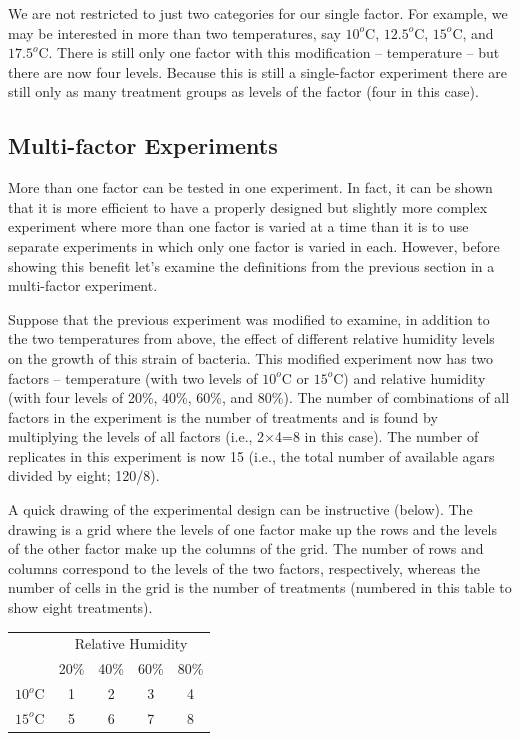 \documentclass[10pt,openany]{book}\usepackage[]{graphicx}\usepackage[]{color}
\begin{document}
We are not restricted to just two categories for our single factor.  For example, we may be interested in more than two temperatures, say $10^{o}$C, $12.5^{o}$C, $15^{o}$C, and $17.5^{o}$C.  There is still only one factor with this modification -- temperature -- but there are now four levels.  Because this is still a single-factor experiment there are still only as many treatment groups as levels of the factor (four in this case).

\subsection{Multi-factor Experiments}
More than one factor can be tested in one experiment.  In fact, it can be shown that it is more efficient to have a properly designed but slightly more complex experiment where more than one factor is varied at a time than it is to use separate experiments in which only one factor is varied in each.  However, before showing this benefit let's examine the definitions from the previous section in a multi-factor experiment.

Suppose that the previous experiment was modified to examine, in addition to the two temperatures from above, the effect of different relative humidity levels on the growth of this strain of bacteria.  This modified experiment now has two factors -- temperature (with two levels of $10^{o}$C or $15^{o}$C) and relative humidity (with four levels of 20\%, 40\%, 60\%, and 80\%).  The number of combinations of all factors in the experiment is the number of treatments and is found by multiplying the levels of all factors (i.e., 2$\times$4=8 in this case).  The number of replicates in this experiment is now 15 (i.e., the total number of available agars divided by eight; 120/8).

A quick drawing of the experimental design can be instructive (below).  The drawing is a grid where the levels of one factor make up the rows and the levels of the other factor make up the columns of the grid.  The number of rows and columns correspond to the levels of the two factors, respectively, whereas the number of cells in the grid is the number of treatments (numbered in this table to show eight treatments).

\begin{center}
\begin{tabular}{cc|c|c|c}
 & \multicolumn{4}{c}{Relative Humidity} \\
\cline{2-5}
 & 20\% & 40\% & 60\% & 80\% \\
\cline{2-5}
\multicolumn{1}{c|}{$10^{o}$C} & 1 & 2 & 3 & \multicolumn{1}{c|}{4} \\
\hline
\multicolumn{1}{c|}{$15^{o}$C} & 5 & 6 & 7 & \multicolumn{1}{c|}{8} \\
\cline{2-5}
\end{tabular}
\end{center}
\end{document}
